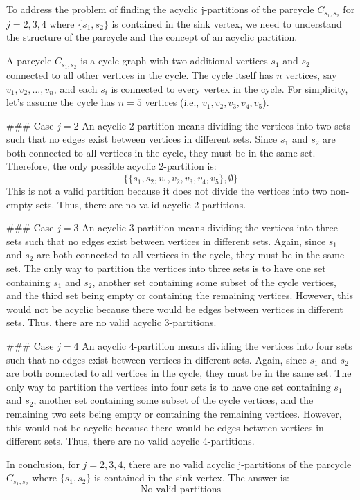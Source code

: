 To address the problem of finding the acyclic j-partitions of the parcycle \(C_{s_1, s_2}\) for \(j = 2, 3, 4\) where \(\{s_1, s_2\}\) is contained in the sink vertex, we need to understand the structure of the parcycle and the concept of an acyclic partition.

A parcycle \(C_{s_1, s_2}\) is a cycle graph with two additional vertices \(s_1\) and \(s_2\) connected to all other vertices in the cycle. The cycle itself has \(n\) vertices, say \(v_1, v_2, \ldots, v_n\), and each \(s_i\) is connected to every vertex in the cycle. For simplicity, let's assume the cycle has \(n = 5\) vertices (i.e., \(v_1, v_2, v_3, v_4, v_5\)).

### Case \(j = 2\)
An acyclic 2-partition means dividing the vertices into two sets such that no edges exist between vertices in different sets. Since \(s_1\) and \(s_2\) are both connected to all vertices in the cycle, they must be in the same set. Therefore, the only possible acyclic 2-partition is:
\[
\{\{s_1, s_2, v_1, v_2, v_3, v_4, v_5\}, \emptyset\}
\]
This is not a valid partition because it does not divide the vertices into two non-empty sets. Thus, there are no valid acyclic 2-partitions.

### Case \(j = 3\)
An acyclic 3-partition means dividing the vertices into three sets such that no edges exist between vertices in different sets. Again, since \(s_1\) and \(s_2\) are both connected to all vertices in the cycle, they must be in the same set. The only way to partition the vertices into three sets is to have one set containing \(s_1\) and \(s_2\), another set containing some subset of the cycle vertices, and the third set being empty or containing the remaining vertices. However, this would not be acyclic because there would be edges between vertices in different sets. Thus, there are no valid acyclic 3-partitions.

### Case \(j = 4\)
An acyclic 4-partition means dividing the vertices into four sets such that no edges exist between vertices in different sets. Again, since \(s_1\) and \(s_2\) are both connected to all vertices in the cycle, they must be in the same set. The only way to partition the vertices into four sets is to have one set containing \(s_1\) and \(s_2\), another set containing some subset of the cycle vertices, and the remaining two sets being empty or containing the remaining vertices. However, this would not be acyclic because there would be edges between vertices in different sets. Thus, there are no valid acyclic 4-partitions.

In conclusion, for \(j = 2, 3, 4\), there are no valid acyclic j-partitions of the parcycle \(C_{s_1, s_2}\) where \(\{s_1, s_2\}\) is contained in the sink vertex. The answer is:
\[
\boxed{\text{No valid partitions}}
\]